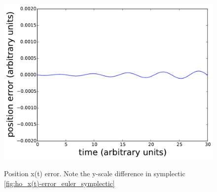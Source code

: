 \begin{figure}
{            \includegraphics[scale=0.24]{fig/ho/ho_x(t)-error_euler_symplectic.pdf}
            \label{fig:ho_x(t)-error_euler_symplectic}
        }
        \caption{Position x(t) error. Note the y-scale difference in symplectic \ref{fig:ho_x(t)-error_euler_symplectic}}
    \label{fig:ho_x(t)-error_euler}
\end{figure}

